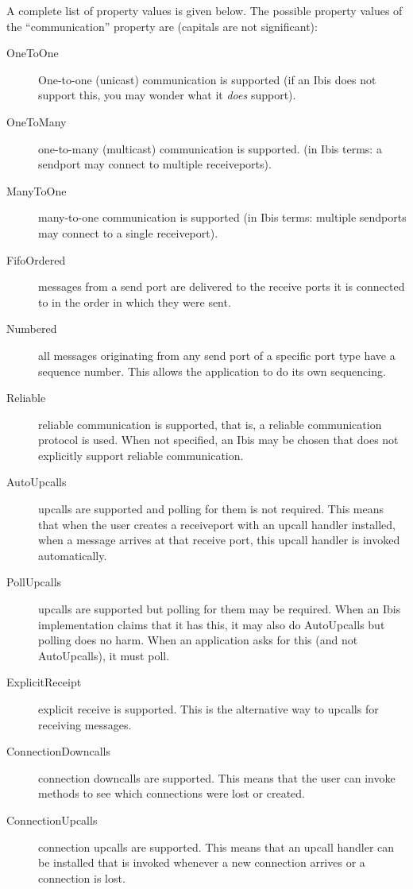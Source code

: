 \documentclass[10pt]{article}
\begin{document}
A complete list of property values is given below.
The possible property values of the ``communication'' property are
(capitals are not significant):
\begin{description}
\item[OneToOne]
One-to-one (unicast) communication is supported (if an Ibis does not support
this, you may wonder what it \emph{does} support).
\item[OneToMany]
one-to-many (multicast) communication is supported.
(in Ibis terms: a sendport
may connect to multiple receiveports).
\item[ManyToOne]
many-to-one communication is supported (in Ibis terms: multiple
sendports may connect to a single receiveport).
\item[FifoOrdered]
messages from a send port are delivered to the receive ports it is
connected to in the order in which they were sent.
\item[Numbered]
all messages originating from any send port of a specific port type have
a sequence number. This allows the application to do its own sequencing.
\item[Reliable]
reliable communication is supported, that is,
a reliable communication protocol is used.
When not specified, an Ibis may be chosen that does not explicitly
support reliable communication.
\item[AutoUpcalls]
upcalls are supported and polling for them is not required.
This means that when the user creates a receiveport with an upcall
handler installed, when a message arrives at that receive port, 
this upcall handler is invoked automatically.
\item[PollUpcalls]
upcalls are supported but polling for them may be required. When an
Ibis implementation claims that it has this, it may also do
AutoUpcalls but polling does no harm. When an application asks for
this (and not AutoUpcalls), it must poll.
\item[ExplicitReceipt]
explicit receive is supported.
This is the alternative way to upcalls for receiving messages.
\item[ConnectionDowncalls]
connection downcalls are supported. This means that the user can
invoke methods to see which connections were lost or created.
\item[ConnectionUpcalls]
connection upcalls are supported. This means that an upcall
handler can be installed that is invoked whenever a new connection arrives
or a connection is lost.
\end{description}
\end{document}
